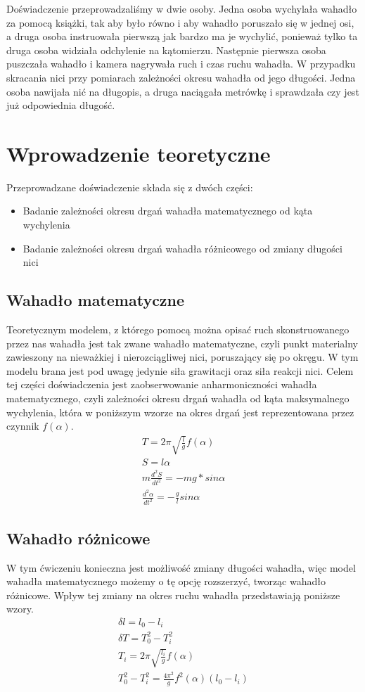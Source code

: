 \documentclass{article}
\begin{document}
\noindent Doświadczenie przeprowadzaliśmy w dwie osoby. Jedna osoba wychylała wahadło za pomocą książki, tak aby było równo i aby wahadło poruszało się w jednej osi, a druga osoba instruowała pierwszą jak bardzo ma je wychylić, ponieważ tylko ta druga osoba widziała odchylenie na kątomierzu. 
Następnie pierwsza osoba puszczała wahadło i kamera nagrywała ruch i czas ruchu wahadła.
W przypadku skracania nici przy pomiarach zależności okresu wahadła od jego długości. Jedna osoba nawijała nić na długopis, a druga naciągała metrówkę i sprawdzała czy jest już odpowiednia długość. 

\clearpage
\section{Wprowadzenie teoretyczne}
Przeprowadzane doświadczenie składa się z dwóch części:
\begin{itemize}
    \item Badanie zależności okresu drgań wahadła matematycznego od kąta
wychylenia
    \item Badanie zależności okresu drgań wahadła różnicowego od
zmiany długości nici
\end{itemize}

\subsection{Wahadło matematyczne}
Teoretycznym modelem, z którego pomocą można opisać ruch skonstruowanego przez nas wahadła jest tak zwane wahadło matematyczne, czyli punkt materialny zawieszony na nieważkiej i nierozciągliwej nici, poruszający się po okręgu. W tym modelu brana jest pod uwagę jedynie siła grawitacji oraz siła reakcji nici. Celem tej części doświadczenia jest zaobserwowanie anharmoniczności wahadła matematycznego, czyli zależności okresu drgań wahadła od kąta maksymalnego wychylenia, która w poniższym wzorze na okres drgań jest reprezentowana przez czynnik $f(\alpha)$.
\begin{gather*}
    T = 2 \pi \sqrt{\frac{l}{g}} f(\alpha) \\
    S = l \alpha \\
    m \frac{d^2S}{dt^2} = -m g * sin \alpha \\
    \frac{d^2 \alpha}{dt^2} = - \frac{g}{l} sin \alpha
\end{gather*}

\subsection{Wahadło różnicowe}
W tym ćwiczeniu konieczna jest możliwość zmiany długości wahadła, więc model wahadła matematycznego możemy o tę opcję rozszerzyć, tworząc wahadło różnicowe. Wpływ tej zmiany na okres ruchu wahadła przedstawiają poniższe wzory.
\begin{gather*}
    \delta l = l_0 - l_i \\
    \delta T = T_0^2 - T_i^2 \\
    T_i = 2 \pi \sqrt{\frac{l_i}{g}} f(\alpha) \\
    T_0^2 - T_i^2 = \frac{4\pi^2}{g}f^2(\alpha) (l_0-l_i)
\end{gather*}
\end{document}
